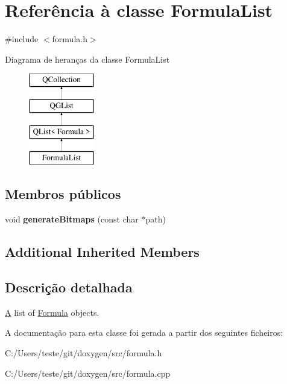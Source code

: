 \hypertarget{class_formula_list}{\section{Referência à classe Formula\-List}
\label{class_formula_list}
}


{\ttfamily \#include $<$formula.\-h$>$}

Diagrama de heranças da classe Formula\-List\begin{figure}[H]
\begin{center}
\leavevmode
\includegraphics[height=4.000000cm]{class_formula_list}
\end{center}
\end{figure}
\subsection*{Membros públicos}
\begin{DoxyCompactItemize}
\item 
\hypertarget{class_formula_list_aca457a5e8f7fae3abae28c9f507561c5}{void {\bfseries generate\-Bitmaps} (const char $\ast$path)}\label{class_formula_list_aca457a5e8f7fae3abae28c9f507561c5}

\end{DoxyCompactItemize}
\subsection*{Additional Inherited Members}


\subsection{Descrição detalhada}
\hyperlink{class_a}{A} list of \hyperlink{class_formula}{Formula} objects. 

A documentação para esta classe foi gerada a partir dos seguintes ficheiros\-:\begin{DoxyCompactItemize}
\item 
C\-:/\-Users/teste/git/doxygen/src/formula.\-h\item 
C\-:/\-Users/teste/git/doxygen/src/formula.\-cpp\end{DoxyCompactItemize}
